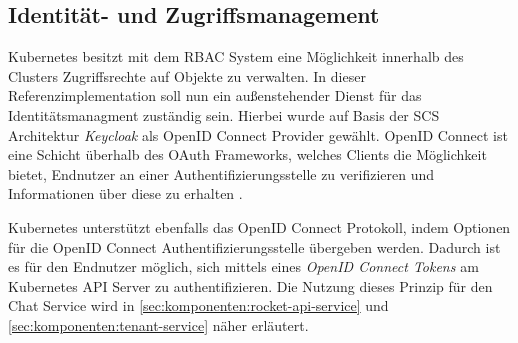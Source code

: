 \subsection{Identität- und Zugriffsmanagement}
Kubernetes besitzt mit dem \ac{RBAC} System eine Möglichkeit innerhalb des Clusters Zugriffsrechte auf Objekte
zu verwalten. In dieser Referenzimplementation soll nun ein außenstehender Dienst für das Identitätsmanagment
zuständig sein. Hierbei wurde auf Basis der \ac{SCS} Architektur \emph{Keycloak} als OpenID Connect Provider gewählt.
OpenID Connect ist eine Schicht überhalb des OAuth Frameworks, welches Clients die Möglichkeit bietet, Endnutzer
an einer Authentifizierungsstelle zu verifizieren und Informationen über diese zu erhalten \cite{OpenID2021}.


Kubernetes unterstützt ebenfalls das OpenID Connect Protokoll, indem Optionen für die OpenID Connect Authentifizierungsstelle
übergeben werden. Dadurch ist es für den Endnutzer möglich, sich mittels eines \emph{OpenID Connect Tokens} am 
Kubernetes API Server zu authentifizieren. Die Nutzung dieses Prinzip für den Chat Service wird 
in \ref{sec:komponenten:rocket-api-service} und \ref{sec:komponenten:tenant-service} näher erläutert.